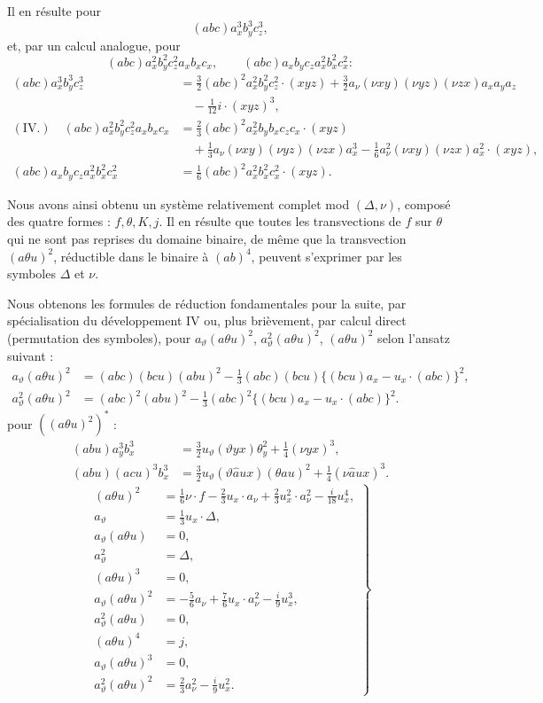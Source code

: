 \documentclass[11pt]{article}
\newcommand{\A}{\Delta}
\begin{document}
Il en résulte pour
\[
(abc)a_x^3b_y^3c_z^3,
\]
et, par un calcul analogue, pour
\[
(abc)a_x^2b_y^2c_z^2a_xb_xc_x,\qquad
(abc)a_xb_yc_za_x^2b_x^2c_x^2:
\]
\[
\begin{aligned}
(abc)a_x^3b_y^3c_z^3
&=\frac32(abc)^2a_x^2b_y^2c_z^2\cdot(xyz)
+\frac32 a_\nu(\nu xy)(\nu yz)(\nu zx)a_xa_ya_z\\
&\quad-\frac1{12}i\cdot(xyz)^3,\\[0.4em]
(\text{IV.})\quad
(abc)a_x^2b_y^2c_z^2a_xb_xc_x
&=\frac23(abc)^2a_x^2b_yb_xc_zc_x\cdot(xyz)
\\
&\quad+\frac13a_\nu(\nu xy)(\nu yz)(\nu zx)a_x^3
-\frac16 a_\nu^2(\nu xy)(\nu zx)a_x^2\cdot(xyz),\\[0.4em]
(abc)a_xb_yc_za_x^2b_x^2c_x^2
&=\frac16(abc)^2a_x^2b_x^2c_x^2\cdot(xyz).
\end{aligned}
\]

Nous avons ainsi obtenu un système relativement complet mod $(\A,\nu)$, composé des quatre formes : $f,\theta,K,j$. Il en résulte que toutes les transvections de $f$ sur $\theta$ qui ne sont pas reprises du domaine binaire, de même que la transvection $(a\theta u)^2$, réductible dans le binaire à $(ab)^4$, peuvent s'exprimer par les symboles $\A$ et $\nu$.

Nous obtenons les formules de réduction fondamentales pour la suite, par spécialisation du développement IV ou, plus brièvement, par calcul direct (permutation des symboles), pour $a_\vartheta(a\theta u)^2$, $a_\vartheta^2(a\theta u)^2$, $(a\theta u)^2$ selon l'ansatz suivant :
\[
\begin{aligned}
a_\vartheta(a\theta u)^2
&=(abc)(bcu)(abu)^2-\frac13(abc)(bcu)\{(bcu)a_x-u_x\cdot(abc)\}^2,\\
a_\vartheta^2(a\theta u)^2
&=(abc)^2(abu)^2-\frac13(abc)^2\{(bcu)a_x-u_x\cdot(abc)\}^2.
\end{aligned}
\]
pour $((a\theta u)^2)^{*}$ :
\[
\begin{aligned}
(abu)a_y^3b_x^3&=\frac32u_\vartheta(\vartheta yx)\theta_y^2+\frac14(\nu yx)^3,\\
(abu)(acu)^3b_x^3&=\frac32u_\vartheta(\vartheta\widehat{a}ux)(\theta au)^2+\frac14(\nu\widehat{a}ux)^3.
\end{aligned}
\]
\[
\left.
\begin{aligned}
(a\theta u)^2&=\frac16\nu\cdot f-\frac23u_x\cdot a_\nu
+\frac23u_x^2\cdot a_\nu^2-\frac{i}{18}u_x^4,\\
a_\vartheta&=\frac13u_x\cdot\A,\\
a_\vartheta(a\theta u)&=0,\\
a_\vartheta^2&=\A,\\
(a\theta u)^3&=0,\\
a_\vartheta(a\theta u)^2&=-\frac56a_\nu+\frac76u_x\cdot a_\nu^2-\frac{i}{9}u_x^3,\\
a_\vartheta^2(a\theta u)&=0,\\
(a\theta u)^4&=j,\\
a_\vartheta(a\theta u)^3&=0,\\
a_\vartheta^2(a\theta u)^2&=\frac23a_\nu^2-\frac{i}{9}u_x^2.
\end{aligned}
\right\} \tag{1}
\]
\end{document}
